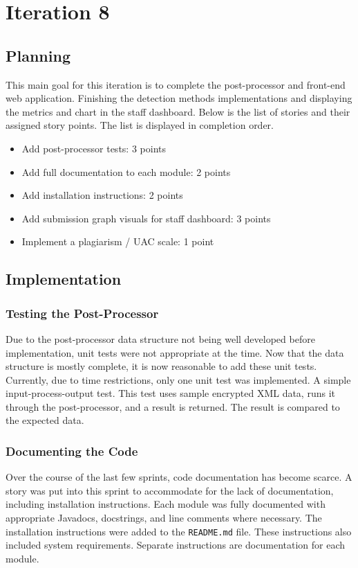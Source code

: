 \chapter{Iteration 8}
\section{Planning}
This main goal for this iteration is to complete the post-processor and front-end web application. Finishing the detection methods implementations and displaying the metrics and chart in the staff dashboard. Below is the list of stories and their assigned story points. The list is displayed in completion order.

\begin{itemize}
\item Add post-processor tests: 3 points
\item Add full documentation to each module: 2 points
\item Add installation instructions: 2 points
\item Add submission graph visuals for staff dashboard: 3 points
\item Implement a plagiarism / UAC scale: 1 point
\end{itemize}

\section{Implementation}
\subsection{Testing the Post-Processor}
Due to the post-processor data structure not being well developed before implementation, unit tests were not appropriate at the time. Now that the data structure is mostly complete, it is now reasonable to add these unit tests. Currently, due to time restrictions, only one unit test was implemented. A simple input-process-output test. This test uses sample encrypted XML data, runs it through the post-processor, and a result is returned. The result is compared to the expected data.

\subsection{Documenting the Code}
Over the course of the last few sprints, code documentation has become scarce. A story was put into this sprint to accommodate for the lack of documentation, including installation instructions. Each module was fully documented with appropriate Javadocs, docstrings, and line comments where necessary. The installation instructions were added to the \texttt{README.md} file. These instructions also included system requirements. Separate instructions are documentation for each module.

